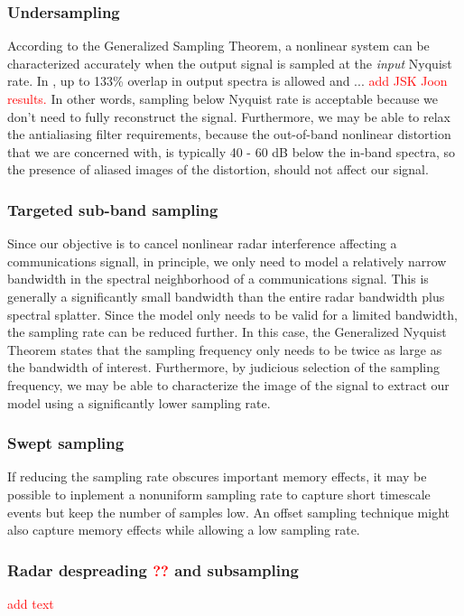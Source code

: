 \documentclass[11pt,onecolumn]{IEEEtran}
\begin{document}
\subsubsection{Undersampling}
According to the Generalized Sampling Theorem, a nonlinear system can be characterized accurately when the output signal is sampled at the \emph{input} Nyquist rate\cite{Tsimbinos94}.  In \cite{Park02Adap}, up to 133\% overlap in output spectra is allowed and ... \textcolor{red}{ add JSK Joon results.}   In other words, sampling below Nyquist rate is acceptable because we don't need to fully reconstruct the signal.  Furthermore, we may be able to relax the antialiasing filter requirements, because the out-of-band nonlinear distortion that we are concerned with, is typically 40 - 60 dB below the in-band spectra, so the presence of aliased images of the distortion, should not affect our signal. 

\subsubsection{Targeted sub-band sampling}
Since our objective is to cancel nonlinear radar interference affecting a communications signall, in principle, we only need to model a relatively narrow bandwidth in the spectral neighborhood of a communications signal.  This is generally a significantly small bandwidth than the entire radar bandwidth plus spectral splatter.  Since the model only needs to be valid for a limited bandwidth, the sampling rate can be reduced further.  In this case, the Generalized Nyquist Theorem states that the sampling frequency only needs to be twice as large as the bandwidth of interest.  Furthermore, by judicious selection of the sampling frequency, we may be able to  characterize the image of the signal to extract our model using a significantly lower sampling rate.

\subsubsection{Swept sampling} If reducing the sampling rate obscures important memory effects, it may be possible to inplement a nonuniform sampling rate to capture short timescale events but keep the number of samples low.  An offset sampling technique might also capture memory effects while allowing a low sampling rate.

\subsubsection{Radar despreading \textcolor{red}{??} and subsampling}  \textcolor{red}{add text}
\end{document}
